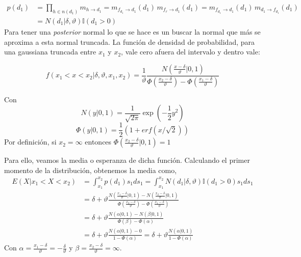 \documentclass[11pt,twoside,spanish]{report} %
\begin{document}
\begin{equation}\label{eq:p_d}
	\begin{split}
		p(d_1) & =  \prod_{h \in n(d_1)} m_{h \rightarrow d_1} = m_{f_{d_1} \rightarrow d_1}(d_1) \, m_{f_r \rightarrow d_1}(d_1) = m_{f_{d_1} \rightarrow d_1}(d_1) \, m_{d_1 \rightarrow f_{d_1}}(d_1)  \\
		& = N(d_1|\delta,\vartheta) \mathbb{I}(d_1 > 0)
	\end{split}
\end{equation}
Para tener una \textit{posterior} normal lo que se hace es un buscar la normal que m\'as se aproxima a esta normal truncada.
La funci\'on de densidad de probabilidad, para una gaussiana truncada entre $x_1$ y $x_2$, vale cero afuera del intervalo  y dentro vale:

\begin{equation}
	f(x_1<x<x_2|\delta,\vartheta,x_1,x_2) = \frac{1}{\vartheta}\frac{N\left(\frac{x-\delta}{\vartheta}|0,1\right)}{\Phi\left(\frac{x_2-\delta}{\vartheta}\right)-\Phi\left(\frac{x_1-\delta}{\vartheta}\right)}
\end{equation}

Con
\begin{equation}
	N(y|0,1) = \frac{1}{\sqrt{2\pi}}\exp\left(-\frac{1}{2}y^2\right)
\end{equation}
\begin{equation}
	\Phi(y|0,1) = \frac{1}{2}(1+erf(x/\sqrt{2}))
\end{equation}
Por definici\'on, si $x_2=\infty$ entonces $\Phi\left(\frac{x_2-\delta}{\vartheta}|0,1\right)=1$

Para ello, veamos la media o esperanza de dicha funci\'on.
Calculando el primer momento de la distribuci\'on, obtenemos la media como,
\begin{equation}\label{eq:mean_aprox_double}
	\begin{split}
		E(X| x_1 < X < x_2) &=  \int_{x_1}^{x_2} p(d_1)s_1ds_1 = \int_{x_1}^{x_2}  N(d_1|\delta,\vartheta) \mathbb{I}(d_1 > 0)s_1ds_1 \\
		&= \delta + \vartheta \frac{N(\frac{x_1-\delta}{\vartheta}|0,1) - N(\frac{x_2-\delta}{\vartheta}|0,1) }{\Phi(\frac{x_2-\delta}{\vartheta}) - \Phi(\frac{x_1-\delta}{\vartheta}) } \\
		&= \delta +\vartheta \frac{N(\alpha|0,1) - N(\beta|0,1) }{\Phi(\beta) - \Phi(\alpha) }\\
		& = \delta + \vartheta \frac{N(\alpha|0,1) - 0 }{1 - \Phi(\alpha) } = \delta + \vartheta \frac{N(\alpha|0,1)}{1 - \Phi(\alpha) }
	\end{split}
\end{equation}
Con $\alpha=\frac{x_1-\delta}{\vartheta}=-\frac{\delta}{\vartheta}$ y $\beta=\frac{x_2-\delta}{\vartheta}=\infty$.
\end{document}

